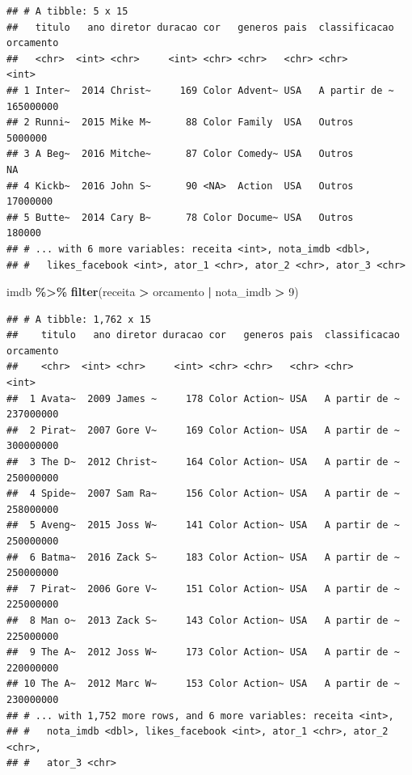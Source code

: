 \documentclass[
]{book}
\newenvironment{Shaded}{\begin{snugshade}}{\end{snugshade}}
\newcommand{\DecValTok}[1]{\textcolor[rgb]{0.00,0.00,0.81}{#1}}
\newcommand{\KeywordTok}[1]{\textcolor[rgb]{0.13,0.29,0.53}{\textbf{#1}}}
\newcommand{\NormalTok}[1]{#1}
\newcommand{\OperatorTok}[1]{\textcolor[rgb]{0.81,0.36,0.00}{\textbf{#1}}}
\newcommand{\StringTok}[1]{\textcolor[rgb]{0.31,0.60,0.02}{#1}}
\begin{document}
\begin{verbatim}
## # A tibble: 5 x 15
##   titulo   ano diretor duracao cor   generos pais  classificacao orcamento
##   <chr>  <int> <chr>     <int> <chr> <chr>   <chr> <chr>             <int>
## 1 Inter~  2014 Christ~     169 Color Advent~ USA   A partir de ~ 165000000
## 2 Runni~  2015 Mike M~      88 Color Family  USA   Outros          5000000
## 3 A Beg~  2016 Mitche~      87 Color Comedy~ USA   Outros               NA
## 4 Kickb~  2016 John S~      90 <NA>  Action  USA   Outros         17000000
## 5 Butte~  2014 Cary B~      78 Color Docume~ USA   Outros           180000
## # ... with 6 more variables: receita <int>, nota_imdb <dbl>,
## #   likes_facebook <int>, ator_1 <chr>, ator_2 <chr>, ator_3 <chr>
\end{verbatim}

\begin{Shaded}
\begin{Highlighting}[]
\NormalTok{imdb }\OperatorTok{\%>\%}
\StringTok{  }\KeywordTok{filter}\NormalTok{(receita }\OperatorTok{>}\StringTok{ }\NormalTok{orcamento }\OperatorTok{|}\StringTok{ }\NormalTok{nota\_imdb }\OperatorTok{>}\StringTok{ }\DecValTok{9}\NormalTok{)}
\end{Highlighting}
\end{Shaded}

\begin{verbatim}
## # A tibble: 1,762 x 15
##    titulo   ano diretor duracao cor   generos pais  classificacao orcamento
##    <chr>  <int> <chr>     <int> <chr> <chr>   <chr> <chr>             <int>
##  1 Avata~  2009 James ~     178 Color Action~ USA   A partir de ~ 237000000
##  2 Pirat~  2007 Gore V~     169 Color Action~ USA   A partir de ~ 300000000
##  3 The D~  2012 Christ~     164 Color Action~ USA   A partir de ~ 250000000
##  4 Spide~  2007 Sam Ra~     156 Color Action~ USA   A partir de ~ 258000000
##  5 Aveng~  2015 Joss W~     141 Color Action~ USA   A partir de ~ 250000000
##  6 Batma~  2016 Zack S~     183 Color Action~ USA   A partir de ~ 250000000
##  7 Pirat~  2006 Gore V~     151 Color Action~ USA   A partir de ~ 225000000
##  8 Man o~  2013 Zack S~     143 Color Action~ USA   A partir de ~ 225000000
##  9 The A~  2012 Joss W~     173 Color Action~ USA   A partir de ~ 220000000
## 10 The A~  2012 Marc W~     153 Color Action~ USA   A partir de ~ 230000000
## # ... with 1,752 more rows, and 6 more variables: receita <int>,
## #   nota_imdb <dbl>, likes_facebook <int>, ator_1 <chr>, ator_2 <chr>,
## #   ator_3 <chr>
\end{verbatim}
\end{document}
